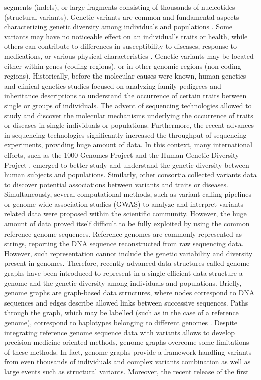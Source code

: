 \documentclass[a4paper, titlepage, openright]{book}
\begin{document}
segments (indels), or large fragments consisting of thousands of nucleotides (structural variants). Genetic variants are common and fundamental aspects characterizing genetic diversity among individuals and populations \citep{siva20081000}. Some variants may have no noticeable effect on an individual's traits or health, while others can contribute to differences in susceptibility to diseases, response to medications, or various physical characteristics \citep{bodmer2008common, ingelman2018integrating, mitchell2007evolutionary}. Genetic variants may be located either within genes (coding regions), or in other genomic regions (non-coding regions). Historically, before the molecular causes were known, human genetics and clinical genetics studies focused on analyzing family pedigrees and inheritance descriptions to understand the occurrence of certain traits between single or groups of individuals. The advent of sequencing technologies allowed to study and discover the molecular mechanisms underlying the occurrence of traits or diseases in single individuals or populations. Furthermore, the recent advances in sequencing technologies significantly increased the throughput of sequencing experiments, providing huge amount of data. In this context, many international efforts, such as the 1000 Genomes Project \citep{siva20081000, 10002015global} and the Human Genetic Diversity Project \citep{cavalli2005human, bergstrom2020insights}, emerged to better study and understand the genetic diversity between human subjects and populations. Similarly, other consortia \citep{sherry2001dbsnp, landrum2020clinvar} collected variants data to discover potential associations between variants and traits or diseases. Simultaneously, several computational methods, such as variant calling \citep{mckenna2010genome} pipelines or genome-wide association studies (GWAS) \citep{uffelmann2021genome} to analyze and interpret variants-related data were proposed within the scientific community. However, the huge amount of data proved itself difficult to be fully exploited by using the common reference genome sequences. Reference genomes are commonly represented as strings, reporting the DNA sequence reconstructed from raw sequencing data. However, such representation cannot include the genetic variability and diversity present in genomes. Therefore, recently advanced data structures called genome graphs \citep{paten2017genome, garrison2018variation} have been introduced to represent in a single efficient data structure a genome and the genetic diversity among individuals and populations. Briefly, genome graphs are graph-based data structures, where nodes correspond to DNA sequences and edges describe allowed links between successive sequences. Paths through the graph, which may be labelled (such as in the case of a reference genome), correspond to haplotypes belonging to different genomes \citep{siren2020haplotype}. Despite integrating reference genome sequence data with variants allows to develop precision medicine-oriented methods, genome graphs overcome some limitations of these methods. In fact, genome graphs provide a framework handling variants from even thousands of individuals and complex variants combination as well as large events such as structural variants. Moreover, the recent release of the first 
\end{document}
